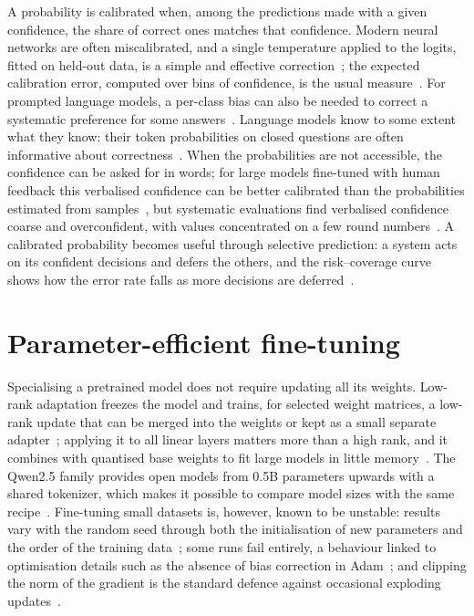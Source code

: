 A probability is calibrated when, among the predictions made with a given confidence, the share of correct ones matches
that confidence. Modern neural networks are often miscalibrated, and a single temperature applied to the logits, fitted on
held-out data, is a simple and effective correction~\cite{guo2017calibration}; the expected calibration error, computed
over bins of confidence, is the usual measure~\cite{naeini2015ece}. For prompted language models, a per-class bias can
also be needed to correct a systematic preference for some answers~\cite{zhao2021calibrate}. Language models know to some
extent what they know: their token probabilities on closed questions are often informative about
correctness~\cite{kadavath2022know}. When the probabilities are not accessible, the confidence can be asked for in words;
for large models fine-tuned with human feedback this verbalised confidence can be better calibrated than the
probabilities estimated from samples~\cite{tian2023justask}, but systematic evaluations find verbalised confidence
coarse and overconfident, with values concentrated on a few round numbers~\cite{xiong2024uncertainty}. A calibrated
probability becomes useful through selective prediction: a system acts on its confident decisions and defers the
others, and the risk--coverage curve shows how the error rate falls as more decisions are deferred~\cite{geifman2017selective}.

\section{Parameter-efficient fine-tuning}
\label{sec:bg-peft}

Specialising a pretrained model does not require updating all its weights. Low-rank adaptation freezes the model and
trains, for selected weight matrices, a low-rank update that can be merged into the weights or kept as a small separate
adapter~\cite{hu2022lora}; applying it to all linear layers matters more than a high rank, and it combines with quantised
base weights to fit large models in little memory~\cite{dettmers2023qlora}. The Qwen2.5 family provides open models from
0.5B parameters upwards with a shared tokenizer, which makes it possible to compare model sizes with the same
recipe~\cite{qwen2024qwen25}. Fine-tuning small datasets is, however, known to be unstable: results vary with the random
seed through both the initialisation of new parameters and the order of the training data~\cite{dodge2020finetuning};
some runs fail entirely, a behaviour linked to optimisation details such as the absence of bias correction in
Adam~\cite{mosbach2021stability}; and clipping the norm of the gradient is the standard defence against occasional
exploding updates~\cite{pascanu2013difficulty}.

